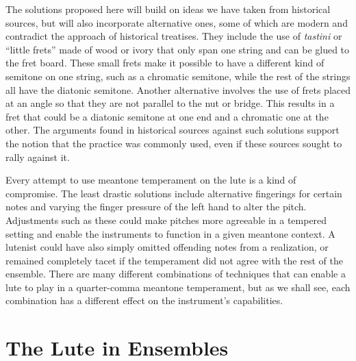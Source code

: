 The solutions proposed here will build on ideas we have taken from historical sources, but will also
incorporate alternative ones, some of which are modern and contradict the approach of historical
treatises. They include the use of \textit{tastini} or ``little frets'' made of wood or ivory that
only span one string and can be glued to the fret board.  These small frets make it possible to have
a different kind of semitone on one string, such as a chromatic semitone, while the rest of the
strings all have the diatonic semitone.  Another alternative involves the use of frets placed at an
angle so that they are not parallel to the nut or bridge.  This results in a fret that could be a
diatonic semitone at one end and a chromatic one at the other.  The arguments found in historical
sources against such solutions support the notion that the practice was commonly used, even if these
sources sought to rally against it.

Every attempt to use meantone temperament on the lute is a kind of
compromise.  The least drastic solutions include alternative fingerings for certain
notes and varying the finger pressure of the left hand to alter the pitch.
Adjustments such as these could make pitches more agreeable in a tempered
setting and enable the instruments to function in a given meantone context.  A
lutenist could have also simply omitted offending notes from a realization, or
remained completely tacet if the  temperament did not agree with the rest of the
ensemble.  There are many different combinations of techniques that can
enable a lute to play in a quarter-comma meantone temperament, but as we shall
see, each combination has a different effect on the instrument's capabilities.

\section{The Lute in Ensembles}

